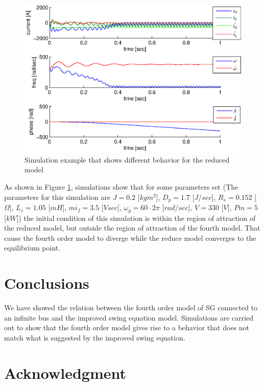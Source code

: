 \documentclass[conference]{IEEEtran}
\begin{document}
\begin{figure}[h]
\includegraphics[scale=0.5]{simDiffRegionOFAttraction}
\caption{Simulation example that shows different behavior for the 
reduced model}
\label{fig:InfBusOne1DiffRegionOfAttraction}
\end{figure}

As shown in Figure \ref{fig:InfBusOne1DiffRegionOfAttraction},
simulations show that for some parameters set (The parameters for this
simulation are $J=0.2$ {[}$kgm^{2}${]}, $D_{p}=1.7$ {[}$J/sec${]},
$R_{s}=0.152$ {[}$\Omega]$, $L_{s}=1.05$ {[}$mH${]}, $mi_{f}=3.5$
{[}$Vsec]$, $\omega_{g}=60\cdotp2\pi$ {[}$rad/sec${]}, $V=330$
{[}$V]$, $Pm=5$ {[}$kW${]}) the initial condition of this simulation
is within the region of attraction of the reduced model, but outside
the region of attraction of the fourth model. That cause the fourth
order model to diverge while the reduce model converges to the
equilibrium point.


\section{Conclusions}

We have showed the relation between the fourth order model of SG connected
to an infinite bus and the improved swing equation model. Simulations
are carried out to show that the fourth order model gives rise to
a behavior that does not match what is suggested by the improved swing
equation. 


\section*{Acknowledgment}
\end{document}
